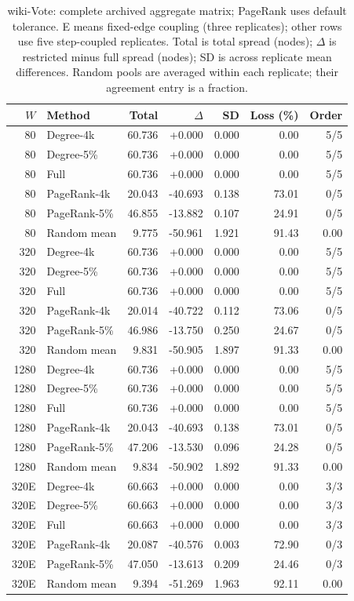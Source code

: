 \begin{table}[htbp]
\caption{wiki-Vote: complete archived aggregate matrix; PageRank uses default tolerance. E means fixed-edge coupling (three replicates); other rows use five step-coupled replicates. Total is total spread (nodes); $\Delta$ is restricted minus full spread (nodes); SD is across replicate mean differences. Random pools are averaged within each replicate; their agreement entry is a fraction.}\label{tab:s-wiki_vote}
\begin{tabular}{rlrrrrr}
\toprule
$W$ & Method & Total & $\Delta$ & SD & Loss (\%) & Order \\
\midrule
80 & Degree-4k & 60.736 & +0.000 & 0.000 & 0.00 & 5/5 \\
80 & Degree-5\% & 60.736 & +0.000 & 0.000 & 0.00 & 5/5 \\
80 & Full & 60.736 & +0.000 & 0.000 & 0.00 & 5/5 \\
80 & PageRank-4k & 20.043 & -40.693 & 0.138 & 73.01 & 0/5 \\
80 & PageRank-5\% & 46.855 & -13.882 & 0.107 & 24.91 & 0/5 \\
80 & Random mean & 9.775 & -50.961 & 1.921 & 91.43 & 0.00 \\
320 & Degree-4k & 60.736 & +0.000 & 0.000 & 0.00 & 5/5 \\
320 & Degree-5\% & 60.736 & +0.000 & 0.000 & 0.00 & 5/5 \\
320 & Full & 60.736 & +0.000 & 0.000 & 0.00 & 5/5 \\
320 & PageRank-4k & 20.014 & -40.722 & 0.112 & 73.06 & 0/5 \\
320 & PageRank-5\% & 46.986 & -13.750 & 0.250 & 24.67 & 0/5 \\
320 & Random mean & 9.831 & -50.905 & 1.897 & 91.33 & 0.00 \\
1280 & Degree-4k & 60.736 & +0.000 & 0.000 & 0.00 & 5/5 \\
1280 & Degree-5\% & 60.736 & +0.000 & 0.000 & 0.00 & 5/5 \\
1280 & Full & 60.736 & +0.000 & 0.000 & 0.00 & 5/5 \\
1280 & PageRank-4k & 20.043 & -40.693 & 0.138 & 73.01 & 0/5 \\
1280 & PageRank-5\% & 47.206 & -13.530 & 0.096 & 24.28 & 0/5 \\
1280 & Random mean & 9.834 & -50.902 & 1.892 & 91.33 & 0.00 \\
320E & Degree-4k & 60.663 & +0.000 & 0.000 & 0.00 & 3/3 \\
320E & Degree-5\% & 60.663 & +0.000 & 0.000 & 0.00 & 3/3 \\
320E & Full & 60.663 & +0.000 & 0.000 & 0.00 & 3/3 \\
320E & PageRank-4k & 20.087 & -40.576 & 0.003 & 72.90 & 0/3 \\
320E & PageRank-5\% & 47.050 & -13.613 & 0.209 & 24.46 & 0/3 \\
320E & Random mean & 9.394 & -51.269 & 1.963 & 92.11 & 0.00 \\
\bottomrule
\end{tabular}
\end{table}
